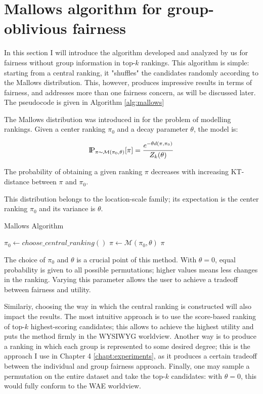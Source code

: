 \section{Mallows algorithm for group-oblivious fairness}

In this section I will introduce the algorithm developed and analyzed by us for fairness without group information in top-$k$ rankings. This algorithm is simple: starting from a central ranking, it "shuffles" the candidates randomly according to the Mallows distribution. This, however, produces impressive results in terms of fairness, and addresses more than one fairness concern, as will be discussed later. The pseudocode is given in Algorithm \ref{alg:mallows}

The Mallows distribution was introduced in \cite{mallows} for the problem of modelling rankings. Given a center ranking $\pi_0$ and a decay parameter $\theta$, the model is:

\[
\text{I\kern-0.15em P}_{\pi \sim \mathcal{M}(\pi_0, \theta)}[\pi] = \frac {e^{-\theta d(\pi, \pi_0)}}{Z_k(\theta)}
\]

The probability of obtaining a given ranking $\pi$ decreases with increasing KT-distance between $\pi$ and $\pi_0$.

This distribution belongs to the location-scale family; its expectation is the center ranking $\pi_0$ and its variance is $\theta$.

\begin{algorithm}[h]
\caption{\small{Mallows Algorithm}}
\label{alg:mallows}
\small
\begin{algorithmic}[1]
\STATE $\pi_0 \leftarrow choose\_central\_ranking()$
\STATE $\pi \leftarrow \mathcal{M}(\pi_0, \theta)$
\RETURN $\pi$
\end{algorithmic}
\vspace{-1ex}
\end{algorithm}

The choice of $\pi_0$ and $\theta$ is a crucial point of this method. With $\theta = 0$, equal probability is given to all possible permutations; higher values means less changes in the ranking. Varying this parameter allows the user to achieve a tradeoff between fairness and utility.

Similariy, choosing the way in which the central ranking is constructed will also impact the results. The most intuitive approach is to use the score-based ranking of top-$k$ highest-scoring candidates; this allows to achieve the highest utility and puts the method firmly in the WYSIWYG worldview. Another way is to produce a ranking in which each group is represented to some desired degree; this is the approach I use in Chapter 4 \ref{chapt:experiments}, as it produces a certain tradeoff between the individual and group fairness approach. Finally, one may sample a permutation on the entire dataset and take the top-$k$ candidates: with $\theta = 0$, this would fully conform to the WAE worldview.

